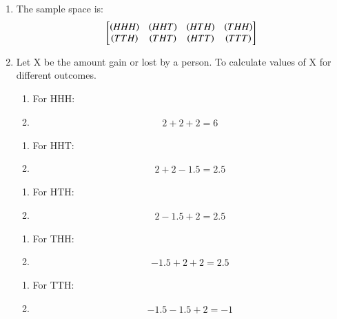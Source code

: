 \renewcommand{\theequation}{\theenumi}
\begin{enumerate}

\item The sample space is:
\begin{align}
\begin{bmatrix}
\left(HHH\right) & \left(HHT\right) & \left(HTH\right) & \left(THH\right) \\ 
\left(TTH\right) & \left(THT\right) & \left(HTT\right) & \left(TTT\right)
\end{bmatrix}
\end{align}

\item Let X be the amount gain or lost by a person. To calculate values of X for different outcomes.

\begin{enumerate}
\item For HHH:
\item
\begin{align}
2+2+2 = 6
\end{align}
\end{enumerate}

\begin{enumerate}
\item For HHT:
\item
\begin{align}
2+2-1.5 = 2.5
\end{align}
\end{enumerate}

\begin{enumerate}
\item For HTH:
\item
\begin{align}
2-1.5+2 = 2.5
\end{align}
\end{enumerate}

\begin{enumerate}
\item For THH:
\item
\begin{align}
-1.5+2+2 = 2.5
\end{align}
\end{enumerate}

\begin{enumerate}
\item For TTH:
\item
\begin{align}
-1.5-1.5+2 =-1
\end{align}
\end{enumerate}


\end{enumerate}
